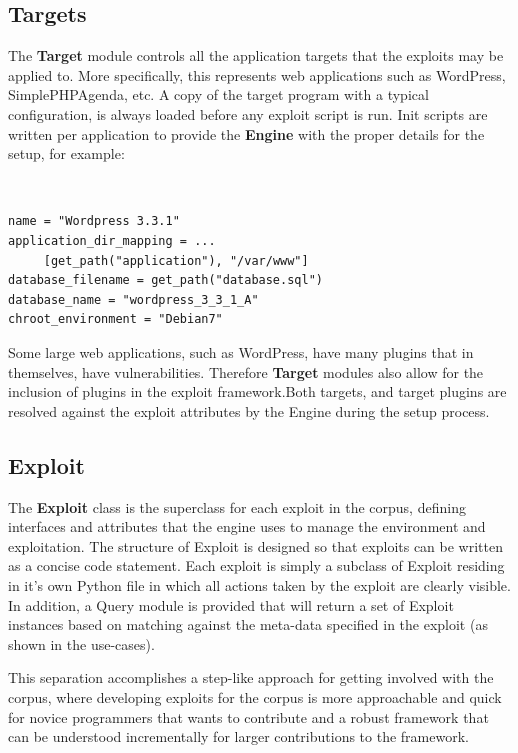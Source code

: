 \documentclass[letterpaper,twocolumn,10pt]{article}
\begin{document}
\subsection{Targets}
   The {\bf Target} module controls all the application targets that the exploits may be applied to.  More specifically, this represents web applications such as WordPress, SimplePHPAgenda, etc. A copy of the target program with a typical configuration, is always loaded before any exploit script is run.  Init scripts are written per application to provide the {\bf Engine} with the proper details for the setup, for example:

\begin{minipage}{\textwidth}
{\tt \footnotesize
\begin{lstlisting}
name = "Wordpress 3.3.1"
application_dir_mapping = ...
     [get_path("application"), "/var/www"]
database_filename = get_path("database.sql")
database_name = "wordpress_3_3_1_A"
chroot_environment = "Debian7"
\end{lstlisting}
} 
\end{minipage}


Some large web applications, such as WordPress, have many plugins that in themselves, have vulnerabilities. Therefore {\bf Target} modules also allow for the inclusion of plugins in the exploit framework.Both targets, and target plugins are resolved against the exploit attributes by the Engine during the setup process. 


\subsection{Exploit}
The {\bf Exploit} class is the superclass for each exploit in the corpus, defining interfaces and attributes that the engine uses to manage the environment and exploitation. The structure of Exploit is designed so that exploits can be written as a concise code statement. Each exploit is simply a subclass of Exploit residing in it's own Python file in which all actions taken by the exploit are clearly visible. In addition, a Query module is provided that will return a set of Exploit instances based on matching against the meta-data specified in the exploit (as shown in the use-cases).\par

This separation accomplishes a step-like approach for getting involved with the corpus, where developing exploits for the corpus is more approachable and quick for novice programmers that wants to contribute and a robust framework that can be understood incrementally for larger contributions to the framework.\par
 
\end{document}
